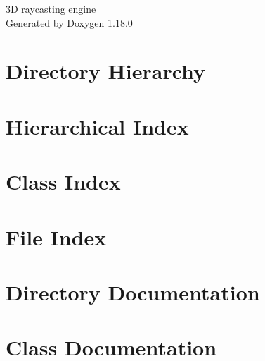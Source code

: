 \documentclass[twoside]{book}
\newcommand{\+}{\discretionary{\mbox{\scriptsize$\hookleftarrow$}}{}{}}
\newcommand{\clearemptydoublepage}{%
    \newpage{\pagestyle{empty}\cleardoublepage}%
  }
\begin{document}
  \raggedbottom
    \hypersetup{pageanchor=false,
                bookmarksnumbered=true,
                pdfencoding=unicode
               }
  \begin{titlepage}
  \vspace*{7cm}
  \begin{center}%
  {\Large 3\+D raycasting engine}\\
  \vspace*{1cm}
  {\large Generated by Doxygen 1.18.0}\\
  \end{center}
  \end{titlepage}
  \clearemptydoublepage
  \tableofcontents
  \clearemptydoublepage
  \hypersetup{pageanchor=true}
\chapter{Directory Hierarchy}

\chapter{Hierarchical Index}

\chapter{Class Index}

\chapter{File Index}

\chapter{Directory Documentation}


\chapter{Class Documentation}

























\end{document}
